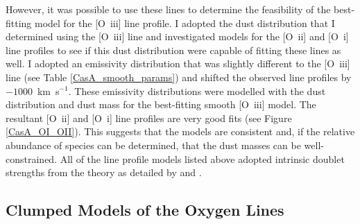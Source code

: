 However, it was possible to use these lines to determine the feasibility of the best-fitting model for the  [O~{\sc iii}] line profile.  I adopted the dust distribution that I determined using the [O~{\sc iii}] line and investigated models for the [O~{\sc ii}] and [O~{\sc i}] line profiles to see if this dust distribution were capable of fitting these lines as well.  I adopted an emissivity distribution that was slightly different to the [O~{\sc iii}] line (see Table \ref{CasA_smooth_params}) and shifted the observed line profiles by $-1000$~km~s$^{-1}$.  These emissivity distributions were modelled with the dust distribution and dust mass for the best-fitting smooth [O~{\sc iii}] model.  The resultant [O~{\sc ii}] and [O~{\sc i}] line profiles are very good fits (see Figure \ref{CasA_OI_OII}).  This suggests that the models are consistent and, if the relative abundance of species can be determined, that the dust masses can be well-constrained.  All of the line profile models listed above adopted intrinsic doublet strengths from the theory as detailed by \citet{Zeippen1987} and \citet{Storey2000}.  



\subsection{Clumped Models of the Oxygen Lines}

